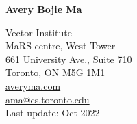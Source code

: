 \documentclass[11pt,letterpaper]{article}
\begin{document}
\raggedright

  {\bfseries\Huge{Avery Bojie Ma}}
  \vspace{10pt}

  {\small
    Vector Institute\\
    MaRS centre, West Tower\\
    661 University Ave., Suite 710\\
    Toronto, ON M5G 1M1\\
    \vspace{-1pt}
    \href{http://averyma.com}{averyma.com}\\
    \vspace{-2pt}
    \href{mailto:ama@cs.toronto.edu}{ama@cs.toronto.edu}
    \vspace{-3pt}\\
    Last update: Oct 2022
  }
  

\end{document}
